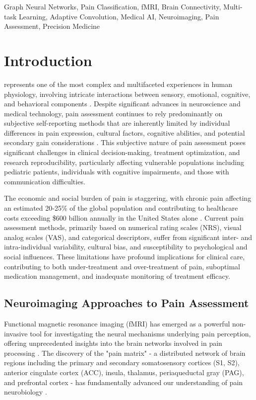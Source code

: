 \documentclass[10pt,journal,compsoc]{IEEEtran}
\begin{document}
\begin{IEEEkeywords}
Graph Neural Networks, Pain Classification, fMRI, Brain Connectivity, Multi-task Learning, Adaptive Convolution, Medical AI, Neuroimaging, Pain Assessment, Precision Medicine
\end{IEEEkeywords}

\section{Introduction}

 represents one of the most complex and multifaceted experiences in human physiology, involving intricate interactions between sensory, emotional, cognitive, and behavioral components \cite{melzack2001pain}. Despite significant advances in neuroscience and medical technology, pain assessment continues to rely predominantly on subjective self-reporting methods that are inherently limited by individual differences in pain expression, cultural factors, cognitive abilities, and potential secondary gain considerations \cite{hjermstad2011studies,williamson2005pain}. This subjective nature of pain assessment poses significant challenges in clinical decision-making, treatment optimization, and research reproducibility, particularly affecting vulnerable populations including pediatric patients, individuals with cognitive impairments, and those with communication difficulties.

The economic and social burden of pain is staggering, with chronic pain affecting an estimated 20-25\% of the global population and contributing to healthcare costs exceeding \$600 billion annually in the United States alone \cite{davis2020machine}. Current pain assessment methods, primarily based on numerical rating scales (NRS), visual analog scales (VAS), and categorical descriptors, suffer from significant inter- and intra-individual variability, cultural bias, and susceptibility to psychological and social influences. These limitations have profound implications for clinical care, contributing to both under-treatment and over-treatment of pain, suboptimal medication management, and inadequate monitoring of treatment efficacy.

\subsection{Neuroimaging Approaches to Pain Assessment}

Functional magnetic resonance imaging (fMRI) has emerged as a powerful non-invasive tool for investigating the neural mechanisms underlying pain perception, offering unprecedented insights into the brain networks involved in pain processing \cite{tracey2008neuromatrix,apkarian2011human}. The discovery of the "pain matrix" - a distributed network of brain regions including the primary and secondary somatosensory cortices (S1, S2), anterior cingulate cortex (ACC), insula, thalamus, periaqueductal gray (PAG), and prefrontal cortex - has fundamentally advanced our understanding of pain neurobiology \cite{wager2013atlas}.
\end{document}
